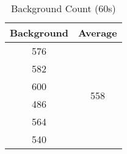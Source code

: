 \begin{table}[h]
	\centering
	\begin{tabular}{|c|c|}
		\hline
		\textbf{Background} & \textbf{Average}    \\ \hline
		576                  & \multirow{6}{*}{558} \\ \cline{1-1}
		582                 &                     \\ \cline{1-1}
		600                 &                     \\ \cline{1-1}
		486                 &                     \\ \cline{1-1}
		564                 &                     \\ \cline{1-1}
		540                 &                     \\ \hline
	\end{tabular}
	\caption{Background Count (60s)}
	\label{tab:2}
\end{table}